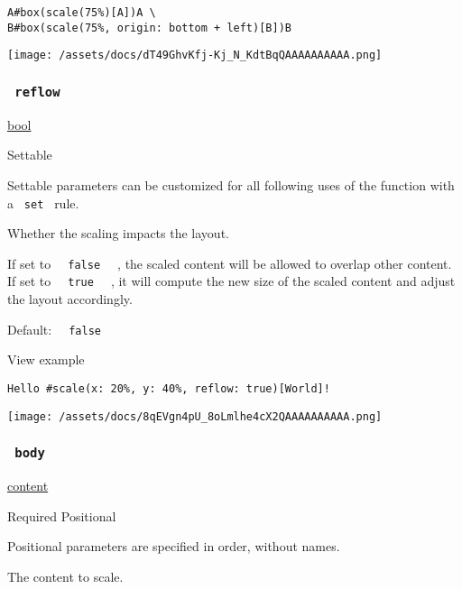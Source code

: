 \begin{verbatim}
A#box(scale(75%)[A])A \
B#box(scale(75%, origin: bottom + left)[B])B
\end{verbatim}

\texttt{[image: /assets/docs/dT49GhvKfj-Kj\_N\_KdtBqQAAAAAAAAAA.png]}

\subsubsection{\texorpdfstring{\texttt{\ reflow\ }}{ reflow }}\label{parameters-reflow}

\href{/docs/reference/foundations/bool/}{bool}

{{ Settable }}

\label{parameters-reflow-settable-tooltip}
Settable parameters can be customized for all following uses of the
function with a \texttt{\ set\ } rule.

Whether the scaling impacts the layout.

If set to \texttt{\ }{\texttt{\ false\ }}\texttt{\ } , the scaled
content will be allowed to overlap other content. If set to
\texttt{\ }{\texttt{\ true\ }}\texttt{\ } , it will compute the new size
of the scaled content and adjust the layout accordingly.

Default: \texttt{\ }{\texttt{\ false\ }}\texttt{\ }


View example

\begin{verbatim}
Hello #scale(x: 20%, y: 40%, reflow: true)[World]!
\end{verbatim}

\texttt{[image: /assets/docs/8qEVgn4pU\_8oLmlhe4cX2QAAAAAAAAAA.png]}

\subsubsection{\texorpdfstring{\texttt{\ body\ }}{ body }}\label{parameters-body}

\href{/docs/reference/foundations/content/}{content}

{Required} {{ Positional }}

\label{parameters-body-positional-tooltip}
Positional parameters are specified in order, without names.

The content to scale.

